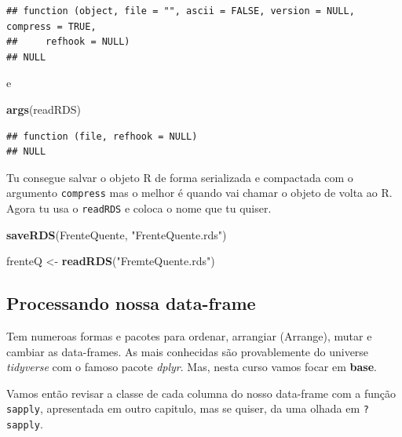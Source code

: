 \documentclass[]{book}
\newenvironment{Shaded}{\begin{snugshade}}{\end{snugshade}}
\newcommand{\KeywordTok}[1]{\textcolor[rgb]{0.13,0.29,0.53}{\textbf{#1}}}
\newcommand{\StringTok}[1]{\textcolor[rgb]{0.31,0.60,0.02}{#1}}
\newcommand{\NormalTok}[1]{#1}
\theoremstyle{definition}
\theoremstyle{definition}
\theoremstyle{definition}
\theoremstyle{remark}
\begin{document}
\begin{verbatim}
## function (object, file = "", ascii = FALSE, version = NULL, compress = TRUE, 
##     refhook = NULL) 
## NULL
\end{verbatim}

e

\begin{Shaded}
\begin{Highlighting}[]
\KeywordTok{args}\NormalTok{(readRDS)}
\end{Highlighting}
\end{Shaded}

\begin{verbatim}
## function (file, refhook = NULL) 
## NULL
\end{verbatim}

Tu consegue salvar o objeto R de forma serializada e compactada com o
argumento \texttt{compress} mas o melhor é quando vai chamar o objeto de
volta ao R. Agora tu usa o \texttt{readRDS} e coloca o nome que tu
quiser.

\begin{Shaded}
\begin{Highlighting}[]
\KeywordTok{saveRDS}\NormalTok{(FrenteQuente, }\StringTok{"FrenteQuente.rds"}\NormalTok{)}
\end{Highlighting}
\end{Shaded}

\begin{Shaded}
\begin{Highlighting}[]
\NormalTok{frenteQ <-}\StringTok{ }\KeywordTok{readRDS}\NormalTok{(}\StringTok{"FremteQuente.rds"}\NormalTok{)}
\end{Highlighting}
\end{Shaded}

\hypertarget{processing_dfs}{\subsection{Processando nossa
data-frame}\label{processing_dfs}}

Tem numeroas formas e pacotes para ordenar, arrangiar (Arrange), mutar e
cambiar as data-frames. As mais conhecidas são provablemente do universe
\emph{tidyverse} com o famoso pacote \emph{dplyr}. Mas, nesta curso
vamos focar em \textbf{base}.

Vamos então revisar a classe de cada columna do nosso data-frame com a
função \texttt{sapply}, apresentada em outro capitulo, mas se quiser, da
uma olhada em \texttt{?sapply}.
\end{document}
